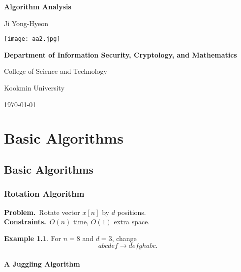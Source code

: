 \documentclass[12pt,openany]{book}
\theoremstyle{definition}
\newtheorem{example}{Example}[chapter]
\begin{document}
	
	\begin{titlepage}
		\begin{center}
			{\Huge\textsf{\textbf{Algorithm Analysis}}\par}
			\vspace{0.5in}
			{\Large Ji Yong-Hyeon\par}
			\vspace{1in}
			\texttt{[image: aa2.jpg]}\par
			\vspace{1in}
			{\bf Department of Information Security, Cryptology, and Mathematics\par}
			{College of Science and Technology\par}
			{Kookmin University\par}
			\vspace{.25in}
			{\large \today\par}
		\end{center}
	\end{titlepage}
	
	\tableofcontents
	
	\mainmatter
	
	\part{Basic Algorithms}
	
	\chapter{Basic Algorithms}
	\section{Rotation Algorithm}
	\begin{tcolorbox}[colback=white,colframe=lemcolor,arc=5pt,title={\color{white}\bf Rotation}]
		\textbf{Problem.}\ Rotate vector \(x[n]\) by $d$ positions.\\
		\textbf{Constraints.}\ $O(n)$ time, $O(1)$ extra space.
	\end{tcolorbox}
	\begin{example}
		For $n=8$ and $d=3$, change \[
		abcdef\to defghabc.
		\]
	\end{example}

	\newpage
	\subsection{A Juggling Algorithm}
	
\end{document}
